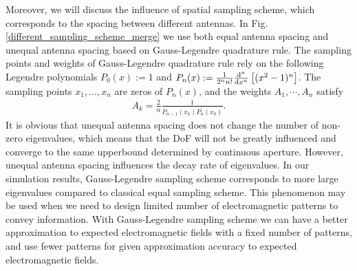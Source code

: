 \documentclass[12pt,draftclsnofoot,journal,onecolumn]{IEEEtran}
\begin{document}
		Moreover, we will discuss the influence of spatial sampling scheme, which corresponds to the spacing between different antennas. In Fig. \ref{different_sampling_scheme_merge} we use both equal antenna spacing and unequal antenna spacing based on Gauss-Legendre quadrature rule. The sampling points and weights of Gauss-Legendre quadrature rule rely on the following Legendre polynomials
		$P_0(x) :=  1$ and
		$P_n(x) := \frac{1}{2^n n!}\frac{{\rm d}^n}{{\rm d}x^n}\left[ (x^2-1)^n \right]$. The sampling points $x_1,\dots,x_n$ are zeros of $P_{n}(x)$, and the weights $A_1,\cdots,A_n$ satisfy
		\begin{equation}
			\begin{aligned}
				A_k = \frac{2}{n} \frac{1}{P_{n-1}(x_k)P^{'}_{n}(x_k)}.
			\end{aligned}
		\end{equation}
		It is obvious that unequal antenna spacing does not change the number of non-zero eigenvalues, which means that the DoF will not be greatly influenced and converge to the same upperbound determined by continuous aperture. However, unequal antenna spacing influences the decay rate of eigenvalues. In our simulation results, Gauss-Legendre sampling scheme corresponds to more large eigenvalues compared to classical equal sampling scheme. This phenomenon may be used when we need to design limited number of electromagnetic patterns to convey information. With Gauss-Legendre sampling scheme we can have a better approximation to expected electromagnetic fields with a fixed number of patterns, and use fewer patterns for given approximation accuracy to expected electromagnetic fields.
\end{document}

